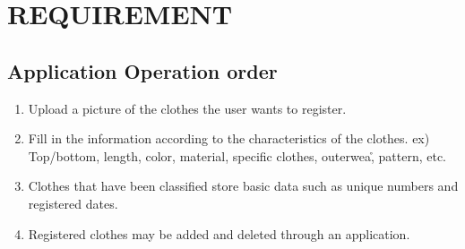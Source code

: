 \documentclass[conference]{IEEEtran}
\begin{document}
\section{REQUIREMENT}

\subsection{Application Operation order}
\begin{enumerate}
    \item Upload a picture of the clothes the user wants to register.
    \item Fill in the information according to the characteristics of the clothes. ex) Top/bottom, length, color, material, specific clothes, outerwea\r, pattern, etc.
    \item Clothes that have been classified store basic data such as unique numbers and registered dates.
    \item Registered clothes may be added and deleted through an application.
\end{enumerate}
\end{document}
